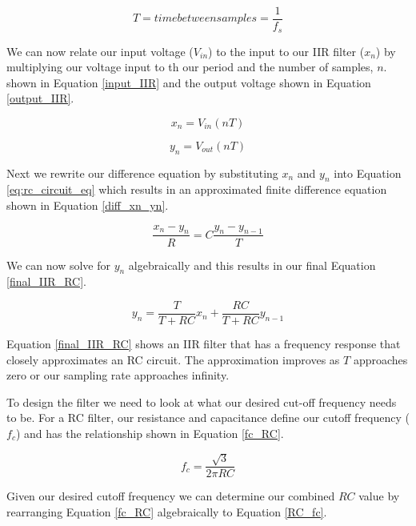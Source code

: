 \begin{equation}\label{sampling_rate_eq}
T=time between samples=\frac{1}{f_s}
\end{equation}

We can now relate our input voltage ($V_{in}$) to the input to our IIR filter ($x_n$) by multiplying our voltage input to th our period and the number of samples, $n$. shown in Equation \ref{input_IIR} and the output voltage shown in Equation \ref{output_IIR}.

\begin{equation}\label{input_IIR}
x_n=V_{in}(nT)
\end{equation}

\begin{equation}\label{output_IIR}
y_n=V_{out}(nT)
\end{equation}

Next we rewrite our difference equation by substituting $x_n$ and $y_n$ into Equation \ref{eq:rc_circuit_eq} which results in an approximated finite difference equation shown in Equation \ref{diff_xn_yn}.

\begin{equation}\label{diff_xn_yn}
\frac{x_n-y_n}{R}=C\frac{y_n-y_{n-1}}{T}
\end{equation}

We can now solve for $y_n$ algebraically and this results in our final Equation \ref{final_IIR_RC}.

\begin{equation}\label{final_IIR_RC}
y_n=\frac{T}{T+RC}x_n+\frac{RC}{T+RC}y_{n-1}
\end{equation}

Equation \ref{final_IIR_RC} shows an IIR filter that has a frequency response that closely approximates an RC circuit.  The approximation improves as $T$ approaches zero or our sampling rate approaches infinity.

To design the filter we need to look at what our desired cut-off frequency needs to be.  For a RC filter, our resistance and capacitance define our cutoff frequency ($f_c$) and has the relationship shown in Equation \ref{fc_RC}.

\begin{equation}\label{fc_RC}
f_c=\frac{\sqrt{3}}{2\pi RC}
\end{equation}

Given our desired cutoff frequency we can determine our combined $RC$ value by rearranging Equation \ref{fc_RC} algebraically to Equation \ref{RC_fc}.

